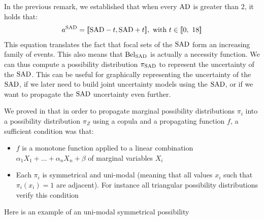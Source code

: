 \begin{remark}
    In the previous remark, we established that when every ${\mathrm{AD}}$ is greater than $2$, it holds that:
    \begin{align*}
        a^{\mathrm{SAD}} = {[\![}{\mathrm{SAD}}-t,{\mathrm{SAD}}+t{]\!]},\text{ with }t\in{[\![}0, ~18{]\!]}
    \end{align*}
    This equation translates the fact that focal sets of the ${\mathrm{SAD}}$ form an increasing family of events. This also means that ${\mathrm{Bel}}_{\mathrm{SAD}}$ is actually a necessity function. We can thus compute a possibility distribution $\pi_{\mathrm{SAD}}$ to represent the uncertainty of the ${\mathrm{SAD}}$. This can be useful for graphically representing the uncertainty of the ${\mathrm{SAD}}$, if we later need to build joint uncertainty models using the ${\mathrm{SAD}}$, or if we want to propagate the ${\mathrm{SAD}}$ uncertainty even further.
    
    We proved in \cite{malinowski_uncertainty_2024} that in order to propagate marginal possibility distributions $\pi_i$ into a possibility distribution $\pi_Z$ using a copula and a propagating function $f$, a sufficient condition was that:
    \begin{itemize}
        \item $f$ is a monotone function applied to a linear combination $\alpha_1X_1+\dots+\alpha_nX_n+\beta$ of marginal variables $X_i$
        \item Each $\pi_i$ is symmetrical and uni-modal (meaning that all values $x_i$ such that $\pi_i(x_i)=1$ are adjacent). For instance all triangular possibility distributions verify this condition
    \end{itemize}
    Here is an example of an uni-modal symmetrical possibility
\end{remark}


